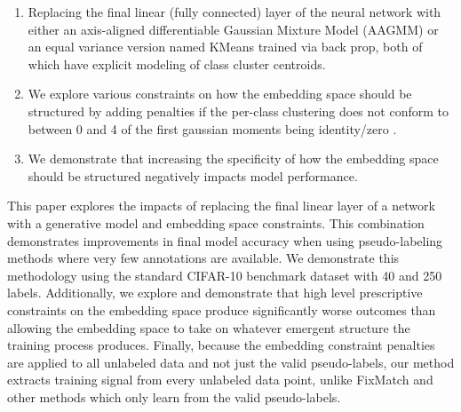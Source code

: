 \documentclass[10pt,twocolumn,letterpaper]{article}
\begin{document}
\begin{enumerate}
	\item Replacing the final linear (fully connected) layer of the neural network with either an axis-aligned differentiable Gaussian Mixture Model (AAGMM) or an equal variance version named KMeans trained via back prop, both of which have explicit modeling of class cluster centroids. 
	\item We explore various constraints on how the embedding space should be structured by adding penalties if the per-class clustering does not conform to between 0 and 4 of the first gaussian moments being identity/zero \cite{pearson1936method}.
	\item We demonstrate that increasing the specificity of how the embedding space should be structured negatively impacts model performance. 
\end{enumerate}

This paper explores the impacts of replacing the final linear layer of a network with a generative model and embedding space constraints.
This combination demonstrates improvements in final model accuracy when using pseudo-labeling methods where very few annotations are available.
We demonstrate this methodology using the standard CIFAR-10 benchmark dataset with 40 and 250 labels\cite{cifar10}. %
Additionally, we explore and demonstrate that high level prescriptive constraints on the embedding space produce significantly worse outcomes than allowing the embedding space to take on whatever emergent structure the training process produces. 
Finally, because the embedding constraint penalties are applied to all unlabeled data and not just the valid pseudo-labels, our method extracts training signal from every unlabeled data point, unlike FixMatch \cite{sohn2020fixmatch} and other methods which only learn from the valid pseudo-labels.


\end{document}

